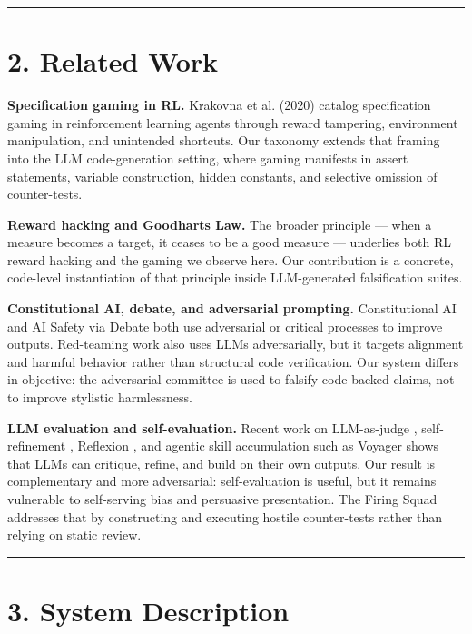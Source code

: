 \documentclass[
]{article}
\begin{document}
\begin{center}\rule{0.5\linewidth}{0.5pt}\end{center}

\section{2. Related Work}\label{2-related-work}

\textbf{Specification gaming in RL.} Krakovna et al. (2020) catalog
specification gaming in reinforcement learning agents through reward
tampering, environment manipulation, and unintended shortcuts. Our
taxonomy extends that framing into the LLM code-generation setting,
where gaming manifests in assert statements, variable construction,
hidden constants, and selective omission of counter-tests.

\textbf{Reward hacking and Goodhart\textquotesingle s Law.} The broader
principle --- when a measure becomes a target, it ceases to be a good
measure --- underlies both RL reward hacking and the gaming we observe
here. Our contribution is a concrete, code-level instantiation of that
principle inside LLM-generated falsification suites.

\textbf{Constitutional AI, debate, and adversarial prompting.}
Constitutional AI \citep{bai2022} and AI Safety via Debate \citep{irving2018} both use adversarial or critical processes to improve
outputs. Red-teaming work \citep{perez2022} also uses LLMs
adversarially, but it targets alignment and harmful behavior rather than
structural code verification. Our system differs in objective: the
adversarial committee is used to falsify code-backed claims, not to
improve stylistic harmlessness.

\textbf{LLM evaluation and self-evaluation.} Recent work on LLM-as-judge \citep{zheng2023}, self-refinement \citep{madaan2023}, Reflexion \citep{shinn2023reflexion}, and agentic skill accumulation such as Voyager \citep{wang2023voyager} shows that LLMs can critique, refine, and build on
their own outputs. Our result is complementary and more adversarial:
self-evaluation is useful, but it remains vulnerable to self-serving
bias and persuasive presentation. The Firing Squad addresses that by
constructing and executing hostile counter-tests rather than relying on
static review.

\begin{center}\rule{0.5\linewidth}{0.5pt}\end{center}

\section{3. System Description}\label{3-system-description}
\end{document}
